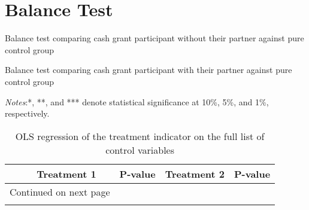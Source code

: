 \documentclass[10pt,a4paper]{article}
\begin{document}
\tableofcontents

\listoftables

\pagebreak

\section{Balance Test}

\begin{table}[H]\centering\caption{Balance test comparing cash grant participant without their partner against pure control group}
\resizebox{\textwidth}{!}{}
\end{table}

\begin{table}[H]\centering\caption{Balance test comparing cash grant participant with their partner against pure control group}
	\resizebox{\textwidth}{!}{}
\end{table}

\begin{center}
	{\tiny \tabcolsep=1pt  %
		\begin{ThreePartTable}
			\begin{TableNotes}[flushleft]
				\tiny
				\item \textit{Notes}:*, **, and *** denote statistical significance at 10\%, 5\%, and 1\%, respectively.
			\end{TableNotes}
			\begin{longtable}{l*{4}{c}}
				\caption{OLS regression of the treatment indicator on the full list of control variables}\label{tab:balance_omni}					\\
				\toprule
				\hline 
				&\multicolumn{1}{p{2cm}}{\centering Treatment 1}
				&\multicolumn{1}{p{2cm}}{\centering P-value}
				&\multicolumn{1}{p{2cm}}{\centering Treatment 2}
				&\multicolumn{1}{p{2cm}}{\centering P-value} \\
				\hline 
				\endfirsthead
				\hline
				\endhead
				\hline
				\multicolumn{2}{r}{{Continued on next page}} \\
				\endfoot
				
				\bottomrule
				\insertTableNotes
				\endlastfoot
				
			\end{longtable}
		\end{ThreePartTable}
	}
\end{center}
\end{document}
